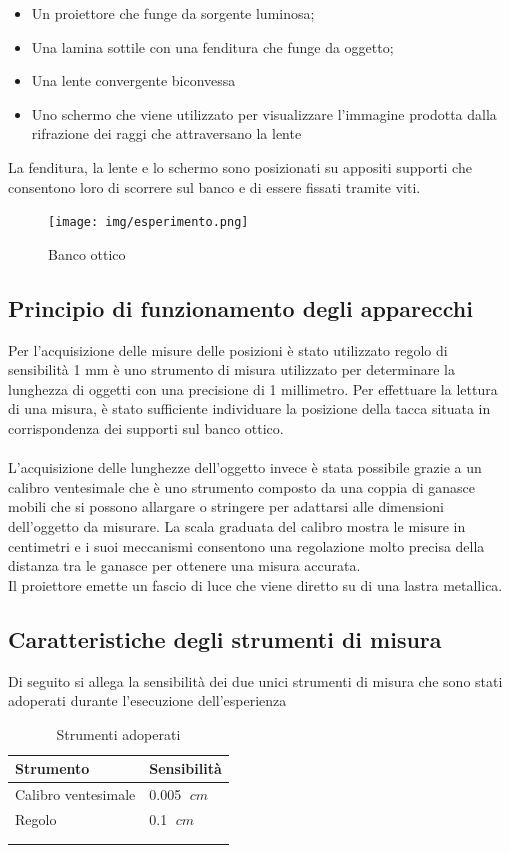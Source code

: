 \documentclass[11pt,a4paper]{article}
\begin{document}
\begin{itemize}
    \item Un proiettore che funge da sorgente luminosa;
    \item Una lamina sottile con una fenditura che funge da oggetto;
    \item Una lente convergente biconvessa
    \item Uno schermo che viene utilizzato per visualizzare l'immagine prodotta dalla rifrazione dei raggi che attraversano la lente
\end{itemize}

La fenditura, la lente e lo schermo sono posizionati su  appositi supporti che consentono loro di scorrere sul banco e di essere fissati tramite viti.

\begin{figure}[H]
    \centering
    \texttt{[image: img/esperimento.png]}
    \caption{Banco ottico}
    \label{fig:exp}
\end{figure}

\subsection{Principio di funzionamento degli apparecchi}

Per l'acquisizione delle misure delle posizioni è stato utilizzato regolo di sensibilità 1 mm è uno strumento di misura utilizzato per determinare la lunghezza di oggetti con una precisione di 1 millimetro. Per effettuare la lettura di una misura, è stato sufficiente individuare la posizione della tacca situata in corrispondenza dei supporti sul banco ottico.
\\ \\
L'acquisizione delle lunghezze dell'oggetto invece è stata possibile grazie a un calibro ventesimale che è uno strumento composto da una coppia di ganasce mobili che si possono allargare o stringere per adattarsi alle dimensioni dell'oggetto da misurare. La scala graduata del calibro mostra le misure in centimetri e i suoi meccanismi consentono una regolazione molto precisa della distanza tra le ganasce per ottenere una misura accurata.
\\
Il proiettore emette un fascio di luce che viene diretto su di una lastra metallica.

\subsection{Caratteristiche degli strumenti di misura}
Di seguito si allega la sensibilità dei due unici strumenti di misura che sono stati adoperati durante l'esecuzione dell'esperienza
\begin{longtable}[]{@{}ll@{}}
    \toprule
    Strumento & Sensibilità \tabularnewline
    \midrule
    \endhead
    Calibro ventesimale & 0.005 $\; cm$ \tabularnewline
    Regolo & 0.1 $\; cm$ \tabularnewline
    \bottomrule
    \label{tab:tools}
    \\
    \caption{Strumenti adoperati}
\end{longtable}
\end{document}
